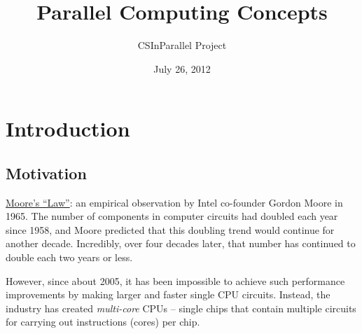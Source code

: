 \documentclass[letterpaper,10pt,openany,oneside]{sphinxmanual}
\title{Parallel Computing Concepts}
\date{July 26, 2012}
\author{CSInParallel Project}
\begin{document}
\maketitle
\tableofcontents
{}\label{index::doc}



\chapter{Introduction}
\label{Introduction/Introduction:introduction}\label{Introduction/Introduction::doc}\label{Introduction/Introduction:parallel-computing-concepts}

\section{Motivation}
\label{Introduction/Introduction:motivation}
\href{http://en.wikipedia.org/wiki/Moore\%27s\_law}{Moore's ``Law''}: an empirical observation by Intel co-founder Gordon Moore in 1965. The number of components in computer circuits had doubled each year since 1958, and Moore predicted that this doubling trend would continue for another decade.  Incredibly, over four decades later, that number has continued to double each two years or less.

However, since about 2005, it has been impossible to achieve such performance improvements by making larger and faster single CPU circuits. Instead, the industry has created \emph{multi-core} CPUs – single chips that contain multiple circuits for carrying out instructions (cores) per chip.
\end{document}
